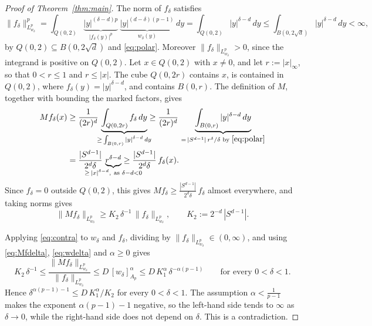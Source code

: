 \documentclass[12pt]{article}
\begin{document}
\begin{proof}[Proof of Theorem~\ref{thm:main}]
The norm of $f_\delta$ satisfies
\[
  \|f_\delta\|_{L^p_{w_\delta}}^p = \int_{Q(0,2)} \underbrace{|y|^{(\delta-d)p}}_{|f_\delta(y)|^p}\ \underbrace{|y|^{(d-\delta)(p-1)}}_{w_\delta(y)}\,dy = \int_{Q(0,2)} |y|^{\delta-d}\,dy \le \int_{B(0,2\sqrt{d})} |y|^{\delta-d}\,dy < \infty,
\]
by $Q(0,2) \subseteq B(0, 2\sqrt{d})$ and \eqref{eq:polar}. Moreover $\|f_\delta\|_{L^p_{w_\delta}} > 0$, since the integrand is positive on $Q(0,2)$. Let $x \in Q(0,2)$ with $x \neq 0$, and let $r := |x|_\infty$, so that $0 < r \le 1$ and $r \le |x|$. The cube $Q(0,2r)$ contains $x$, is contained in $Q(0,2)$, where $f_\delta(y) = |y|^{\delta-d}$, and contains $B(0,r)$. The definition of $M$, together with bounding the marked factors, gives
\begin{align*}
  Mf_\delta(x) &\ge \frac{1}{(2r)^d}\, \underbrace{\int_{Q(0,2r)} f_\delta\,dy}_{\mathclap{\ge\, \int_{B(0,r)} |y|^{\delta-d}\,dy}} \ge \frac{1}{(2r)^d}\, \underbrace{\int_{B(0,r)} |y|^{\delta-d}\,dy}_{=\, |S^{d-1}|\, r^\delta/\delta \text{ by } \eqref{eq:polar}} \\
  &= \frac{|S^{d-1}|}{2^d\delta}\, \underbrace{r^{\delta-d}}_{\mathclap{\ge\, |x|^{\delta-d},\ \text{as } \delta - d < 0}} \ge \frac{|S^{d-1}|}{2^d\delta}\, f_\delta(x).
\end{align*}
Since $f_\delta = 0$ outside $Q(0,2)$, this gives $Mf_\delta \ge \frac{|S^{d-1}|}{2^d\delta}\, f_\delta$ almost everywhere, and taking norms gives
\begin{equation}\label{eq:Mfdelta}
  \|Mf_\delta\|_{L^p_{w_\delta}} \ge K_2\, \delta^{-1}\, \|f_\delta\|_{L^p_{w_\delta}}, \qquad K_2 := 2^{-d}\, |S^{d-1}|.
\end{equation}

Applying \eqref{eq:contra} to $w_\delta$ and $f_\delta$, dividing by $\|f_\delta\|_{L^p_{w_\delta}} \in (0,\infty)$, and using \eqref{eq:Mfdelta}, \eqref{eq:wdelta} and $\alpha \ge 0$ gives
\[
  K_2\, \delta^{-1} \le \frac{\|Mf_\delta\|_{L^p_{w_\delta}}}{\|f_\delta\|_{L^p_{w_\delta}}} \le D\, [w_\delta]_{A_p}^{\alpha} \le D\, K_1^\alpha\, \delta^{-\alpha(p-1)} \qquad \text{for every } 0 < \delta < 1.
\]
Hence $\delta^{\alpha(p-1)-1} \le D\, K_1^\alpha / K_2$ for every $0 < \delta < 1$.
The assumption $\alpha < \frac{1}{p-1}$ makes the exponent $\alpha(p-1) - 1$ negative, so the left-hand side tends to $\infty$ as $\delta \to 0$, while the right-hand side does not depend on $\delta$. This is a contradiction.
\end{proof}

\appendix
\end{document}
